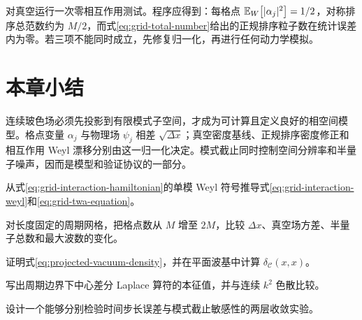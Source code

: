 \begin{chaptercheck}
对真空运行一次零相互作用测试。程序应得到：每格点 $\mathbb{E}_{W}\!\left[|\alpha_j|^2\right]=1/2$，对称排序总范数约为 $M/2$，而式\eqref{eq:grid-total-number}给出的正规排序粒子数在统计误差内为零。若三项不能同时成立，先修复归一化，再进行任何动力学模拟。
\end{chaptercheck}

\section*{本章小结}

连续玻色场必须先投影到有限模式子空间，才成为可计算且定义良好的相空间模型。格点变量 $\alpha_j$ 与物理场 $\psi_j$ 相差 $\sqrt{\Delta x}$；真空密度基线、正规排序密度修正和相互作用 Weyl 漂移分别由这一归一化决定。模式截止同时控制空间分辨率和半量子噪声，因而是模型和验证协议的一部分。

\begin{exercises}
  \item 从式\eqref{eq:grid-interaction-hamiltonian}的单模 Weyl 符号推导式\eqref{eq:grid-interaction-weyl}和\eqref{eq:grid-twa-equation}。
  \item 对长度固定的周期网格，把格点数从 $M$ 增至 $2M$，比较 $\Delta x$、真空场方差、半量子总数和最大波数的变化。
  \item 证明式\eqref{eq:projected-vacuum-density}，并在平面波基中计算 $\delta_{\mathcal C}(x,x)$。
  \item 写出周期边界下中心差分 Laplace 算符的本征值，并与连续 $k^2$ 色散比较。
  \item 设计一个能够分别检验时间步长误差与模式截止敏感性的两层收敛实验。
\end{exercises}
